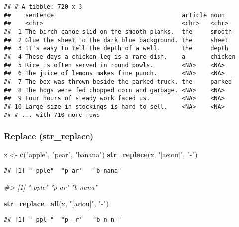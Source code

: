 \documentclass[
]{article}
\newenvironment{Shaded}{\begin{snugshade}}{\end{snugshade}}
\newcommand{\CommentTok}[1]{\textcolor[rgb]{0.56,0.35,0.01}{\textit{#1}}}
\newcommand{\KeywordTok}[1]{\textcolor[rgb]{0.13,0.29,0.53}{\textbf{#1}}}
\newcommand{\NormalTok}[1]{#1}
\newcommand{\StringTok}[1]{\textcolor[rgb]{0.31,0.60,0.02}{#1}}
\begin{document}
\begin{verbatim}
## # A tibble: 720 x 3
##    sentence                                    article noun   
##    <chr>                                       <chr>   <chr>  
##  1 The birch canoe slid on the smooth planks.  the     smooth 
##  2 Glue the sheet to the dark blue background. the     sheet  
##  3 It's easy to tell the depth of a well.      the     depth  
##  4 These days a chicken leg is a rare dish.    a       chicken
##  5 Rice is often served in round bowls.        <NA>    <NA>   
##  6 The juice of lemons makes fine punch.       <NA>    <NA>   
##  7 The box was thrown beside the parked truck. the     parked 
##  8 The hogs were fed chopped corn and garbage. <NA>    <NA>   
##  9 Four hours of steady work faced us.         <NA>    <NA>   
## 10 Large size in stockings is hard to sell.    <NA>    <NA>   
## # ... with 710 more rows
\end{verbatim}

\hypertarget{replace-str_replace}{%
\subsubsection{Replace (str\_replace)}\label{replace-str_replace}}

\begin{Shaded}
\begin{Highlighting}[]
\NormalTok{x \textless{}{-}}\StringTok{ }\KeywordTok{c}\NormalTok{(}\StringTok{"apple"}\NormalTok{, }\StringTok{"pear"}\NormalTok{, }\StringTok{"banana"}\NormalTok{)}
\KeywordTok{str\_replace}\NormalTok{(x, }\StringTok{"[aeiou]"}\NormalTok{, }\StringTok{"{-}"}\NormalTok{)}
\end{Highlighting}
\end{Shaded}

\begin{verbatim}
## [1] "-pple"  "p-ar"   "b-nana"
\end{verbatim}

\begin{Shaded}
\begin{Highlighting}[]
\CommentTok{\#\textgreater{} [1] "{-}pple" "p{-}ar" "b{-}nana"}

\KeywordTok{str\_replace\_all}\NormalTok{(x, }\StringTok{"[aeiou]"}\NormalTok{, }\StringTok{"{-}"}\NormalTok{)}
\end{Highlighting}
\end{Shaded}

\begin{verbatim}
## [1] "-ppl-"  "p--r"   "b-n-n-"
\end{verbatim}
\end{document}
